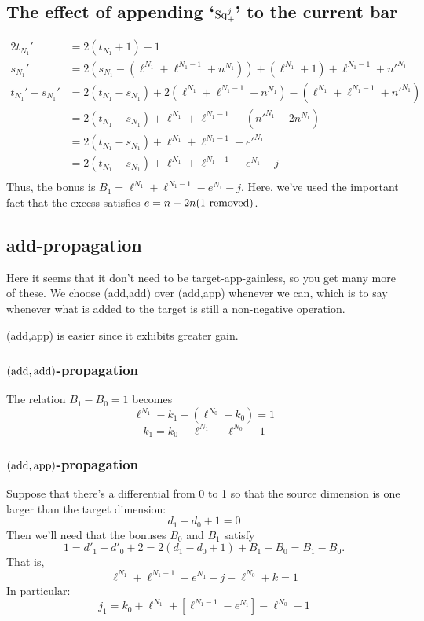 \documentclass[10pt]{article}
\newcommand{\SqShift}{\Sq_{\smash{+}}}
\newcommand{\Sq}{\mathrm{Sq}}
\begin{document}
\begin{conjectured differentials}
\subsection{The effect of appending `$\SqShift^j$' to the current bar}
\begin{alignat*}{2}
t_{N_1}'
&=
2(t_{N_1}+1)-1%
\\
s_{N_1}'&=
2(s_{N_1}-(\ell^{N_1}+\ell^{N_1-1}+n^{N_1}))+ (\ell^{N_1}+1)+\ell^{N_1-1}+{n'}^{N_1}\\
t_{N_1}'-s_{N_1}'&=2(t_{N_1}-s_{N_1})+2(\ell^{N_1}+\ell^{N_1-1}+n^{N_1}) -(\ell^{N_1}+\ell^{N_1-1}+{n'}^{N_1})\\
&=2(t_{N_1}-s_{N_1})+\ell^{N_1}+\ell^{N_1-1}-({n'}^{N_1}-2n^{N_1})\\
&=2(t_{N_1}-s_{N_1})+\ell^{N_1}+\ell^{N_1-1}-{e'}^{N_1}\\
&=2(t_{N_1}-s_{N_1})+\ell^{N_1}+\ell^{N_1-1}-{e}^{N_1}-j\\
\end{alignat*}
Thus, the bonus is $B_1=\ell^{N_1}+\ell^{N_1-1}-{e}^{N_1}-j$.
Here, we've used the important fact that the excess satisfies $e=n-2n(1\textup{ removed})$.
\subsection{add-propagation}
Here it seems that it don't need to be target-app-gainless, so you get many more of these. We choose (add,add) over (add,app) whenever we can, which is to say whenever what is added to the target is still a non-negative operation.

(add,app) is easier since it exhibits greater gain.


\subsubsection{$(\textup{add},\textup{add})$-propagation}
The relation $B_1-B_0=1$ becomes
\[\ell^{N_1}-k_1-(\ell^{N_0}-k_0)=1\]
\[k_1=k_0+\ell^{N_1}-\ell^{N_0}-1\]

\subsubsection{$(\textup{add},\textup{app})$-propagation}
Suppose that there's a differential from 0 to 1 so that the source dimension is one larger than the target dimension:
\[d_1-d_0+1=0\]
Then we'll need that the bonuses $B_0$ and $B_1$ satisfy
\[1=d'_1-d'_0+2=2(d_1-d_0+1)+B_1-B_0=B_1-B_0.\]
That is,
\[\ell^{N_1}+\ell^{N_1-1}-{e}^{N_1}-j-\ell^{N_0}+k=1\]
In particular:
\[j_1=k_0+\ell^{N_1}+[\ell^{N_1-1}-{e}^{N_1}]-\ell^{N_0}-1\]


\end{conjectured differentials}
\end{document}
